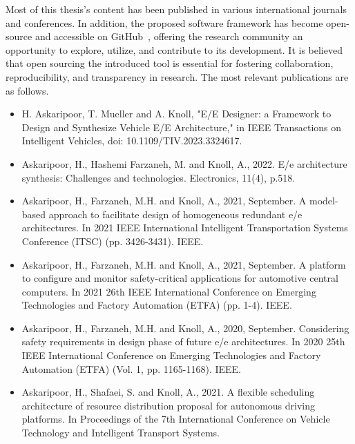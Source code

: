 	Most of this thesis's content has been published in various international journals and conferences. In addition, the proposed software framework has become open-source and accessible on GitHub~\cite{askaripoor2023designer}, offering the research community an opportunity to explore, utilize, and contribute to its development. It is believed that open sourcing the introduced tool is essential for fostering collaboration, reproducibility, and transparency in research.
    The most relevant publications are as follows.
    
    
    \begin{itemize}
    
        \item H. Askaripoor, T. Mueller and A. Knoll, "E/E Designer: a Framework to Design and Synthesize Vehicle E/E Architecture," in IEEE Transactions on Intelligent Vehicles, doi: 10.1109/TIV.2023.3324617.
        
        \item Askaripoor, H., Hashemi Farzaneh, M. and Knoll, A., 2022. E/e architecture synthesis: Challenges and technologies. Electronics, 11(4), p.518.
        
         \item Askaripoor, H., Farzaneh, M.H. and Knoll, A., 2021, September. A model-based approach to facilitate design of homogeneous redundant e/e architectures. In 2021 IEEE International Intelligent Transportation Systems Conference (ITSC) (pp. 3426-3431). IEEE.
        
         \item Askaripoor, H., Farzaneh, M.H. and Knoll, A., 2021, September. A platform to configure and monitor safety-critical applications for automotive central computers. In 2021 26th IEEE International Conference on Emerging Technologies and Factory Automation (ETFA) (pp. 1-4). IEEE.
        
        \item Askaripoor, H., Farzaneh, M.H. and Knoll, A., 2020, September. Considering safety requirements in design phase of future e/e architectures. In 2020 25th IEEE International Conference on Emerging Technologies and Factory Automation (ETFA) (Vol. 1, pp. 1165-1168). IEEE.
        
        \item Askaripoor, H., Shafaei, S. and Knoll, A., 2021. A flexible scheduling architecture of resource distribution proposal for autonomous driving platforms. In Proceedings of the 7th International Conference on Vehicle Technology and Intelligent Transport Systems.
        

\end{itemize}
